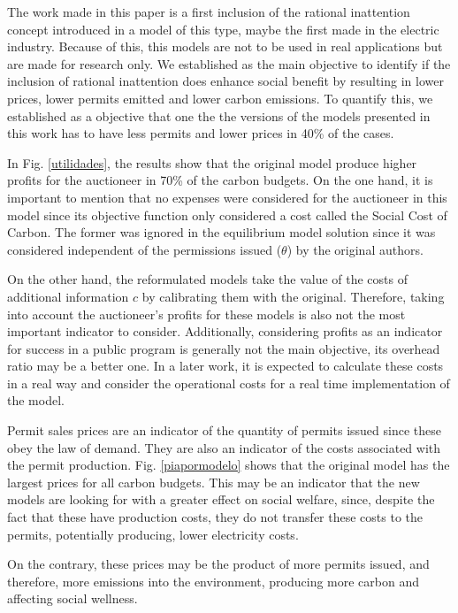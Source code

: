 \documentclass[a4paper,fleqn]{cas-dc}
\begin{document}
The work made in this paper is a first inclusion of the rational inattention concept introduced in a model of this type, maybe the first made in the electric industry. Because of this, this models are not to be used in real applications but are made for research only. We established as the main objective to identify if the inclusion of rational inattention does enhance social benefit by resulting in lower prices, lower permits emitted and lower carbon emissions. To quantify this, we established as a objective that one the the versions of the models presented in this work has to have less permits and lower prices in 40\% of the cases.


In Fig. \ref{utilidades}, the results show that the original model produce higher profits for the auctioneer in 70\% of the carbon budgets. On the one hand, it is important to mention that no expenses were considered for the auctioneer in this model since its objective function only considered a cost called the Social Cost of Carbon. The former was ignored in the equilibrium model solution since it was considered independent of the permissions issued ($\theta$) by the original authors.

On the other hand, the reformulated models take the value of the costs of additional information $c$ by calibrating them with the original. Therefore, taking into account the auctioneer's profits for these models is also not the most important indicator to consider. Additionally, considering profits as an indicator for success in a public program is generally not the main objective, its overhead ratio may be a better one. In a later work, it is expected to calculate these costs in a real way and consider the operational costs for a real time implementation of the model.

Permit sales prices are an indicator of the quantity of permits issued since these obey the law of demand. They are also an indicator of the costs associated with the permit production. Fig. \ref{piapormodelo} shows that the original model has the largest prices for all carbon budgets. This may be an indicator that the new models are looking for
with a greater effect on social welfare, since, despite the fact that these have production costs, they do not transfer these costs to the permits, potentially producing, lower electricity costs.

On the contrary, these prices may be the product of more permits issued, and therefore, more emissions into the environment, producing more carbon and affecting social wellness. 
\end{document}

